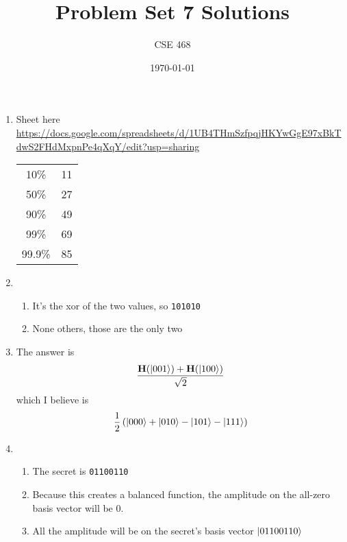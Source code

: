 \documentclass[12pt]{article}
\title{Problem Set 7 Solutions}
\author{CSE 468}
\date{\today}
\begin{document}
\maketitle

\begin{enumerate}[font=\bfseries]
    \item Sheet here \url{https://docs.google.com/spreadsheets/d/1UB4THmSzfpqjHKYwGgE97xBkTdwS2FHdMxpnPe4qXqY/edit?usp=sharing} 

    \begin{center}
    \begin{tabular}{cc}
      10\% &  11  \\
       50\% & 27   \\
         90\% & 49   \\
          99\% & 69   \\
           99.9\% & 85   \\
    \end{tabular}
    \end{center}
    \item \ 
    \begin{enumerate}
        
     \item It's the xor of the two values, so \texttt{101010}
     \item None others, those are the only two
    \end{enumerate}
    \item The answer is \[\frac{\mathbf{H}(\ket{001}) + \mathbf{H}(\ket{100})}{\sqrt{2}}\] which I believe is
    \[ \frac{1}{2}\left(\ket{000}+\ket{010}-\ket{101}-\ket{111}\right)\]
    \item \ 
    \begin{enumerate}
    \item The secret is \texttt{01100110}
    \item Because this creates a balanced function, the amplitude on the all-zero basis vector will be $0$.
    \item All the amplitude will be on the secret's  basis vector $\ket{01100110}$
    \end{enumerate}
\end{enumerate}
\end{document}
